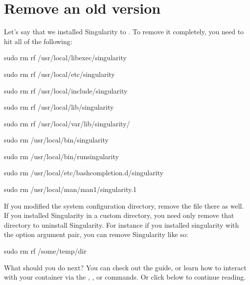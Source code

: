 \documentclass[letterpaper,10pt,english]{sphinxmanual}
\begin{document}
\section{Remove an old version}
\label{\detokenize{installation:remove-an-old-version}}
Let’s say that we installed Singularity to . To remove it completely,
you need to hit all of the following:

%
\begin{sphinxVerbatim}[commandchars=\\\{\}]
\PYGZdl{} sudo rm \PYGZhy{}rf /usr/local/libexec/singularity

\PYGZdl{} sudo rm \PYGZhy{}rf /usr/local/etc/singularity

\PYGZdl{} sudo rm \PYGZhy{}rf /usr/local/include/singularity

\PYGZdl{} sudo rm \PYGZhy{}rf /usr/local/lib/singularity

\PYGZdl{} sudo rm \PYGZhy{}rf /usr/local/var/lib/singularity/

\PYGZdl{} sudo rm /usr/local/bin/singularity

\PYGZdl{} sudo rm /usr/local/bin/run\PYGZhy{}singularity

\PYGZdl{} sudo rm /usr/local/etc/bash\PYGZus{}completion.d/singularity

\PYGZdl{} sudo rm /usr/local/man/man1/singularity.1
\end{sphinxVerbatim}

If you modified the system configuration directory, remove the  file
there as well.
If you installed Singularity in a custom directory, you need only
remove that directory to uninstall Singularity. For instance if you
installed singularity with the  option argument pair, you can remove
Singularity like so:

%
\begin{sphinxVerbatim}[commandchars=\\\{\}]
\PYGZdl{} sudo rm \PYGZhy{}rf /some/temp/dir
\end{sphinxVerbatim}

What should you do next? You can check out the {\hyperref[\detokenize{quick_start:quick-start}]{}} guide, or learn how to
interact with your container via the  ,  , or  commands. Or click 
below to continue reading.
\end{document}
